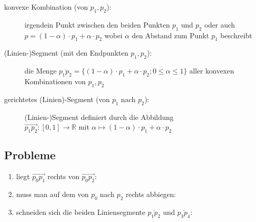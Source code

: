 \vspace*{-0.5\baselineskip}\begin{description}
	\item[konvexe Kombination (von  $p_1,p_2$):] irgendein Punkt zwischen den beiden Punkten $p_1$ und $p_2$ oder auch $p = (1-\alpha)\cdot p_1 + \alpha\cdot p_2$ wobei $\alpha$ den Abstand zum Punkt $p_1$ beschreibt
	\item[(Linien-)Segment (mit den Endpunkten $p_1,p_2$):] die Menge $\overline{p_1p_2}= \{(1-\alpha)\cdot p_1 + \alpha\cdot p_2; 0\leq \alpha\leq 1\}$ aller konvexen Kombinationen von $p_1,p_2$
	\item[gerichtetes (Linien)-Segment (von $p_1$ nach $p_2$):] (Linien-)Segment definiert durch die Abbildung\\ $\overrightarrow{p_1p_2} : [0,1] \longrightarrow \mathbb{R}$ mit $\alpha \mapsto (1-\alpha)\cdot p_1 + \alpha\cdot p_2$
\end{description}

\subsection{Probleme}
\begin{enumerate}
	\item liegt $\overrightarrow{p_0p_1}$ rechts von $\overrightarrow{p_0p_2}$: \\
		\resizebox{1.5cm}{!}{}
	\item muss man auf dem von $p_0$ nach $p_2$ rechts abbiegen:\\
		\resizebox{!}{1.5cm}{}
	\item schneiden sich die beiden Liniensegmente $\overline{p_1p_2}$ und $\overline{p_3p_4}$:\\
		\resizebox{1.5cm}{!}{}
\end{enumerate}

